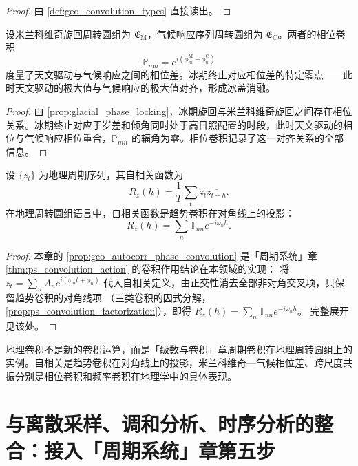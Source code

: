 \begin{proof}
由 \cref{def:geo_convolution_types} 直接读出。
\end{proof}

\begin{proposition}[米兰科维奇旋回与气候响应的相位卷积]\label{prop:geo_milankovitch_climate_convolution}
设米兰科维奇旋回周转圆组为 $\mathfrak E_{\mathrm{M}}$，气候响应序列周转圆组为 $\mathfrak E_{\mathrm{C}}$。两者的相位卷积
\[
\mathbb P_{mn}=e^{i(\phi_m^{\mathrm{M}}-\phi_n^{\mathrm{C}})}
\]
度量了天文驱动与气候响应之间的相位差。冰期终止对应相位差的特定零点——此时天文驱动的极大值与气候响应的极大值对齐，形成冰盖消融。
\end{proposition}

\begin{proof}
由 \cref{prop:glacial_phase_locking}，冰期旋回与米兰科维奇旋回之间存在相位关系。冰期终止对应于岁差和倾角同时处于高日照配置的时段，此时天文驱动的相位与气候响应相位重合，$\mathbb P_{mn}$ 的辐角为零。相位卷积记录了这一对齐关系的全部信息。
\end{proof}

\begin{proposition}[自相关与趋势卷积]\label{prop:geo_autocorr_phase_convolution}
设 $\{z_t\}$ 为地理周期序列，其自相关函数为
\[
R_z(h)=\frac1T\sum_t z_t\overline{z_{t+h}}.
\]
在地理周转圆组语言中，自相关函数是趋势卷积在对角线上的投影：
\[
R_z(h)=\sum_n\mathbb T_{nn}e^{-i\omega_n h}.
\]
\end{proposition}

\begin{proof}
本章的 \cref{prop:geo_autocorr_phase_convolution} 是「周期系统」章 \cref{thm:ps_convolution_action} 的卷积作用结论在本领域的实现：
将 $z_t=\sum_n A_n e^{i(\omega_n t+\phi_n)}$ 代入自相关定义，由正交性消去全部非对角交叉项，只保留趋势卷积的对角线项
（三类卷积的因式分解，\cref{prop:ps_convolution_factorization}），即得 $R_z(h)=\sum_n\mathbb T_{nn}e^{-i\omega_n h}$。
完整展开见该处。
\end{proof}

\begin{remark}[地理卷积与周期卷积的关系]\label{rem:geo_convolution_relation}
地理卷积不是新的卷积运算，而是「级数与卷积」章周期卷积在地理周转圆组上的实例。自相关是趋势卷积在对角线上的投影，米兰科维奇—气候相位差、跨尺度共振分别是相位卷积和频率卷积在地理学中的具体表现。
\end{remark}

\section{与离散采样、调和分析、时序分析的整合：接入「周期系统」章第五步}
\label{sec:geo_integration}


